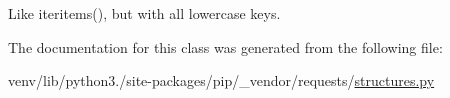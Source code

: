 \begin{DoxyVerb}Like iteritems(), but with all lowercase keys.\end{DoxyVerb}
 

The documentation for this class was generated from the following file\+:\begin{DoxyCompactItemize}
\item 
venv/lib/python3./site-\/packages/pip/\+\_\+vendor/requests/\hyperlink{structures_8py}{structures.\+py}\end{DoxyCompactItemize}
